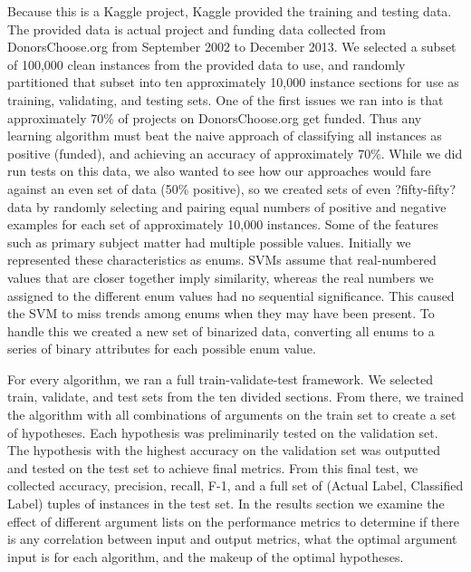 \documentclass{article}
\begin{document}
Because this is a Kaggle project, Kaggle provided the training and testing data. The provided data is actual project and funding data collected from DonorsChoose.org from September 2002 to December 2013. We selected a subset of 100,000 clean instances from the provided data to use, and randomly partitioned that subset into ten approximately 10,000 instance sections for use as training, validating, and testing sets. One of the first issues we ran into is that approximately 70\% of projects on DonorsChoose.org get funded. Thus any learning algorithm must beat the naive approach of classifying all instances as positive (funded), and achieving an accuracy of approximately 70\%. While we did run tests on this data, we also wanted to see how our approaches would fare against an even set of data (50\% positive), so we created sets of even ?fifty-fifty? data by randomly selecting and pairing equal numbers of positive and negative examples for each set of approximately 10,000 instances. Some of the features such as primary subject matter had multiple possible values.  Initially we represented these characteristics as enums. SVMs assume that real-numbered values that are closer together imply similarity, whereas the real numbers we assigned to the different enum values had no sequential significance. This caused the SVM to miss trends among enums when they may have been present. To handle this we created a new set of binarized data, converting all enums to a series of binary attributes for each possible enum value.  

For every algorithm, we ran a full train-validate-test framework. We selected train, validate, and test sets from the ten divided sections. From there, we trained the algorithm with all combinations of arguments on the train set to create a set of hypotheses. Each hypothesis was preliminarily tested on the validation set. The hypothesis with the highest accuracy on the validation set was outputted and tested on the test set to achieve final metrics. From this final test, we collected accuracy, precision, recall, F-1, and a full set of (Actual Label, Classified Label) tuples of instances in the test set. In the results section we examine the effect of different argument lists on the performance metrics to determine if there is any correlation between input and output metrics, what the optimal argument input is for each algorithm, and the makeup of the optimal hypotheses. 
\end{document}
